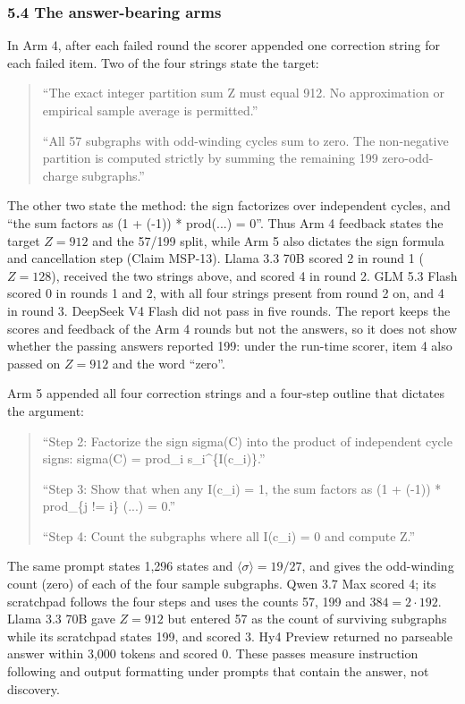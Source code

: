 \documentclass[
  11pt,
]{article}
\begin{document}
\subsubsection{5.4 The answer-bearing
arms}\label{the-answer-bearing-arms}

In Arm 4, after each failed round the scorer appended one correction
string for each failed item. Two of the four strings state the target:

\begin{quote}
``The exact integer partition sum Z must equal 912. No approximation or
empirical sample average is permitted.''

``All 57 subgraphs with odd-winding cycles sum to zero. The non-negative
partition is computed strictly by summing the remaining 199
zero-odd-charge subgraphs.''
\end{quote}

The other two state the method: the sign factorizes over independent
cycles, and ``the sum factors as (1 + (-1)) * prod(...) = 0''. Thus Arm
4 feedback states the target \(Z = 912\) and the 57/199 split, while Arm
5 also dictates the sign formula and cancellation step (Claim MSP-13).
Llama 3.3 70B scored 2 in round 1 (\(Z = 128\)), received the two
strings above, and scored 4 in round 2. GLM 5.3 Flash scored 0 in rounds
1 and 2, with all four strings present from round 2 on, and 4 in round
3. DeepSeek V4 Flash did not pass in five rounds. The report keeps the
scores and feedback of the Arm 4 rounds but not the answers, so it does
not show whether the passing answers reported 199: under the run-time
scorer, item 4 also passed on \(Z = 912\) and the word ``zero''.

Arm 5 appended all four correction strings and a four-step outline that
dictates the argument:

\begin{quote}
``Step 2: Factorize the sign sigma(C) into the product of independent
cycle signs: sigma(C) = prod\_i s\_i\^{}\{I(c\_i)\}.''

``Step 3: Show that when any I(c\_i) = 1, the sum factors as (1 + (-1))
* prod\_\{j != i\} (...) = 0.''

``Step 4: Count the subgraphs where all I(c\_i) = 0 and compute Z.''
\end{quote}

The same prompt states 1,296 states and
\(\langle\sigma\rangle = 19/27\), and gives the odd-winding count (zero)
of each of the four sample subgraphs. Qwen 3.7 Max scored 4; its
scratchpad follows the four steps and uses the counts 57, 199 and
\(384 = 2 \cdot 192\). Llama 3.3 70B gave \(Z = 912\) but entered 57 as
the count of surviving subgraphs while its scratchpad states 199, and
scored 3. Hy4 Preview returned no parseable answer within 3,000 tokens
and scored 0. These passes measure instruction following and output
formatting under prompts that contain the answer, not discovery.
\end{document}
